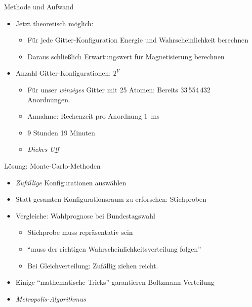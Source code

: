 
\begin{frame}{Methode und Aufwand}
%
\begin{itemize}
\item Jetzt theoretisch möglich:
	\begin{itemize}
	\item Für jede Gitter-Konfiguration Energie und Wahrscheinlichkeit berechnen
	\item Daraus schließlich Erwartungswert für Magnetisierung berechnen
	\end{itemize}
\item Anzahl Gitter-Konfigurationen: $2^V$
	\begin{itemize}
	\item Für unser \emph{winziges} Gitter mit 25 Atomen: Bereits 33\,554\,432 Anordnungen.
	\item Annahme: Rechenzeit pro Anordnung \SI{1}{ms}
	\item[\Thus] 9 Stunden 19 Minuten
	\item[\Thus]  \emph{Dickes Uff}
	\end{itemize}
\end{itemize}
%
\end{frame}


\begin{frame}{Lösung: Monte-Carlo-Methoden}
%
\begin{itemize}
\item \emph{Zufällige} Konfigurationen auswählen
\item[\Thus] Statt gesamten Konfigurationsraum zu erforschen: Stichproben
\item Vergleiche: Wahlprognose bei Bundestagswahl
	\begin{itemize}
	\item Stichprobe muss repräsentativ sein
	\item \enquote{muss der richtigen Wahrscheinlichkeitsverteilung folgen}
	\item Bei Gleichverteilung: Zufällig ziehen reicht.
	\end{itemize}
\item Einige \enquote{mathematische Tricks} garantieren Boltzmann-Verteilung
\item[\Thus] \emph{Metropolis-Algorithmus}
\end{itemize}
%
\end{frame}

